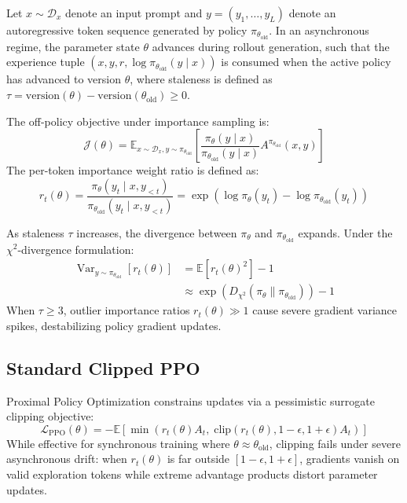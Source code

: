 \documentclass[10pt,twocolumn,letterpaper]{article}
\begin{document}
Let $x \sim \mathcal{D}_x$ denote an input prompt and $y = (y_1, \dots, y_L)$ denote an autoregressive token sequence generated by policy $\pi_{\theta_{\text{old}}}$. In an asynchronous regime, the parameter state $\theta$ advances during rollout generation, such that the experience tuple $(x, y, r, \log \pi_{\theta_{\text{old}}}(y \mid x))$ is consumed when the active policy has advanced to version $\theta$, where staleness is defined as $\tau = \text{version}(\theta) - \text{version}(\theta_{\text{old}}) \ge 0$.

The off-policy objective under importance sampling is:
\begin{equation}
    \mathcal{J}(\theta) = \mathbb{E}_{x \sim \mathcal{D}_x, y \sim \pi_{\theta_{\text{old}}}}\left[ \frac{\pi_\theta(y \mid x)}{\pi_{\theta_{\text{old}}}(y \mid x)} A^{\pi_{\theta_{\text{old}}}}(x, y) \right]
\end{equation}
The per-token importance weight ratio is defined as:
\begin{equation}
    r_t(\theta) = \frac{\pi_\theta(y_t \mid x, y_{<t})}{\pi_{\theta_{\text{old}}}(y_t \mid x, y_{<t})} = \exp\left( \log \pi_\theta(y_t) - \log \pi_{\theta_{\text{old}}}(y_t) \right)
\end{equation}

As staleness $\tau$ increases, the divergence between $\pi_\theta$ and $\pi_{\theta_{\text{old}}}$ expands. Under the $\chi^2$-divergence formulation:
\begin{equation}
\begin{split}
    \operatorname{Var}_{y \sim \pi_{\theta_{\text{old}}}}[r_t(\theta)] &= \mathbb{E}\left[ r_t(\theta)^2 \right] - 1 \\
    &\approx \exp\left( D_{\chi^2}(\pi_\theta \parallel \pi_{\theta_{\text{old}}}) \right) - 1
\end{split}
\end{equation}
When $\tau \ge 3$, outlier importance ratios $r_t(\theta) \gg 1$ cause severe gradient variance spikes, destabilizing policy gradient updates.

\subsection{Standard Clipped PPO}

Proximal Policy Optimization \cite{schulman2017proximal} constrains updates via a pessimistic surrogate clipping objective:
\begin{equation}
    \mathcal{L}_{\text{PPO}}(\theta) = -\mathbb{E}\left[ \min\left( r_t(\theta) A_t, \; \text{clip}(r_t(\theta), 1-\epsilon, 1+\epsilon) A_t \right) \right]
\end{equation}
While effective for synchronous training where $\theta \approx \theta_{\text{old}}$, clipping fails under severe asynchronous drift: when $r_t(\theta)$ is far outside $[1-\epsilon, 1+\epsilon]$, gradients vanish on valid exploration tokens while extreme advantage products distort parameter updates.
\end{document}
